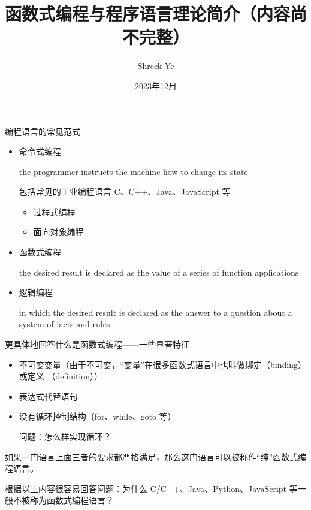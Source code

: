 \documentclass{beamer}
\title{函数式编程与程序语言理论简介（内容尚不完整）}
\author{Shreck Ye}
\date{2023年12月}
\begin{document}
\maketitle



\begin{frame}{编程语言的常见范式}

    \cite{programming_paradigm_wikipedia}
    \begin{itemize}
        \item 命令式编程

              the programmer instructs the machine how to change its state

              包括常见的工业编程语言 C、C++、Java、JavaScript 等
              \begin{itemize}
                  \item 过程式编程
                  \item 面向对象编程
              \end{itemize}
        \item 函数式编程

              the desired result is declared as the value of a series of function applications
        \item 逻辑编程

              in which the desired result is declared as the answer to a question about a system of facts and rules
    \end{itemize}

\end{frame}

\begin{frame}{更具体地回答什么是函数式编程——一些显著特征}
    \begin{itemize}
        \item 不可变变量（由于不可变，“变量”在很多函数式语言中也叫做绑定（binding）或定义 （definition））
        \item 表达式代替语句
        \item 没有循环控制结构（for、while、goto 等）

              问题：怎么样实现循环？
    \end{itemize}

    如果一门语言上面三者的要求都严格满足，那么这门语言可以被称作“纯”函数式编程语言。

    根据以上内容很容易回答问题：为什么 C/C++、Java、Python、JavaScript 等一般不被称为函数式编程语言？
\end{frame}
\end{document}
